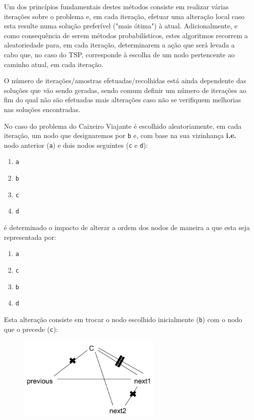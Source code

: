 \documentclass{article}
\begin{document}
Um dos princípios fundamentais destes métodos consiste em realizar várias iterações sobre o problema e, em cada iteração, efetuar uma alteração local caso esta
resulte numa solução preferível ("mais ótima") à atual.
Adicionalmente, e como consequência de serem métodos probabilísticos, estes algoritmos recorrem a aleatoriedade para, em cada iteração, determinarem a ação que será
levada a cabo que, no caso do TSP, corresponde à escolha de um nodo pertencente ao caminho atual, em cada iteração.

O número de iterações/amostras efetuadas/recolhidas está ainda dependente das soluções que vão sendo geradas, sendo comum definir um número de iterações ao fim do qual
não são efetuadas mais alterações caso não se verifiquem melhorias nas soluções encontradas.

No caso do problema do Caixeiro Viajante é escolhido aleatoriamente, em cada iteração, um nodo que designaremos por \texttt{b} e, com base na sua vizinhança \textbf{i.e.} nodo anterior (\texttt{a}) e dois nodos seguintes (\texttt{c} e \texttt{d}):
\begin{enumerate}
    \item \texttt{a}
    \item \texttt{b}
    \item \texttt{c}
    \item \texttt{d}
\end{enumerate}

é determinado o impacto de alterar a ordem dos nodos de maneira a que esta seja representada por:

\begin{enumerate}
    \item \texttt{a}
    \item \texttt{c}
    \item \texttt{b}
    \item \texttt{d}
\end{enumerate}

Esta alteração consiste em trocar o nodo escolhido inicialmente (\texttt{b}) com o nodo que o precede (\texttt{c}):

\begin{figure}[H]
    \centering
    \includegraphics[width=7cm]{Pictures/montecarlo_travellingsalesman.png}
\end{figure}
\end{document}
